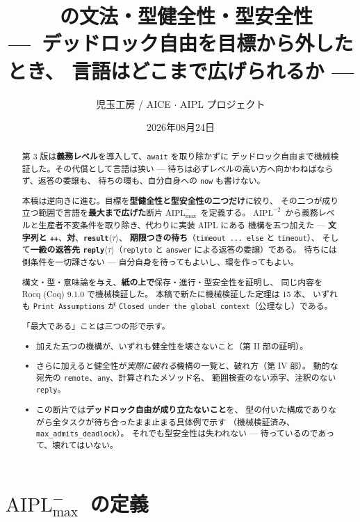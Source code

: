 \documentclass[11pt,a4paper]{ltjsarticle}
\title{\Amax\ の文法・型健全性・型安全性\\
{\large ---\ デッドロック自由を目標から外したとき、
言語はどこまで広げられるか ---}}
\author{児玉工房 / AICE $\cdot$ AIPL プロジェクト}
\date{2026年08月24日}
\theoremstyle{definition}
\theoremstyle{remark}
\newcommand{\Amax}{\ensuremath{\mathrm{AIPL}^{-}_{\max}}}
\newcommand{\Atwo}{\ensuremath{\mathrm{AIPL}^{-2}}}
\begin{document}
\maketitle

\begin{abstract}
第 3 版は\textbf{義務レベル}を導入して、\texttt{await} を取り除かずに
デッドロック自由まで機械検証した。その代償として言語は狭い ---
待ちは必ずレベルの高い方へ向かわねばならず、返答の委譲も、
待ちの環も、自分自身への \texttt{now} も書けない。

本稿は逆向きに進む。目標を\textbf{型健全性と型安全性の二つだけ}に絞り、
その二つが成り立つ範囲で言語を\textbf{最大まで広げた}断片 \Amax\ を定義する。
\Atwo\ から義務レベルと生産者不変条件を取り除き、代わりに実装 AIPL にある
機構を五つ加えた ---
\textbf{文字列と \texttt{++}}、\textbf{対}、\textbf{\texttt{result}$\langle\tau\rangle$}、
\textbf{期限つきの待ち}（\texttt{timeout ... else} と \texttt{timeout}）、
そして\textbf{一級の返答先 \texttt{reply}$\langle\tau\rangle$}（\texttt{replyto} と
\texttt{answer} による返答の委譲）である。
待ちには側条件を一切課さない --- 自分自身を待ってもよいし、環を作ってもよい。

構文・型・意味論を与え、\textbf{紙の上で}保存・進行・型安全性を証明し、
同じ内容を Rocq (Coq) 9.1.0 で機械検証した。
本稿で新たに機械検証した定理は 15 本、
いずれも \texttt{Print Assumptions} が
\texttt{Closed under the global context}（公理なし）である。

「最大である」ことは三つの形で示す。
\begin{itemize}\itemsep2pt
\item 加えた五つの機構が、いずれも健全性を壊さないこと（第 II 部の証明）。
\item さらに加えると健全性が\emph{実際に破れる}機構の一覧と、破れ方（第 IV 部）。
      動的な宛先の \texttt{remote}、\texttt{any}、計算されたメソッド名、
      範囲検査のない添字、注釈のない \texttt{reply}。
\item この断片では\textbf{デッドロック自由が成り立たないこと}を、
      型の付いた構成でありながら全タスクが待ち合ったまま止まる具体例で示す
      （機械検証済み、\texttt{max\_admits\_deadlock}）。
      それでも型安全性は失われない --- 待っているのであって、壊れてはいない。
\end{itemize}
\end{abstract}

\tableofcontents
\bigskip

\part{\Amax\ の定義}
\end{document}
